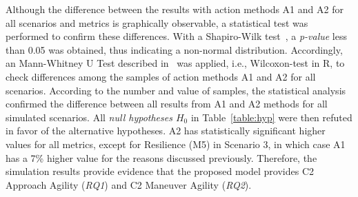  


Although the difference between the results with action methods A1 and A2 for all scenarios and metrics is graphically observable, a statistical test was performed to confirm these differences. With a Shapiro-Wilk test~\citep{stat001}, a \textit{p-value} less than 0.05 was obtained, thus indicating a non-normal distribution. Accordingly, an Mann-Whitney U Test described in~\citet{stat002} was applied, i.e., Wilcoxon-test in R, to check differences among the samples of action methods A1 and A2 for all scenarios. According to the number and value of samples, the statistical analysis confirmed the difference between all results from A1 and A2 methods for all simulated scenarios. All  \emph{null hypotheses $H_0$} in Table~\ref{table:hyp} were then refuted in favor of the alternative hypotheses. A2 has statistically significant higher values for all metrics, except for Resilience (M5) in Scenario 3, in which case A1 has a 7\% higher value for the reasons discussed previously. Therefore, the simulation results provide evidence that the proposed model  provides C2 Approach Agility (\emph{RQ1}) and C2 Maneuver Agility (\emph{RQ2}).


\begin{center}
\end{center}




